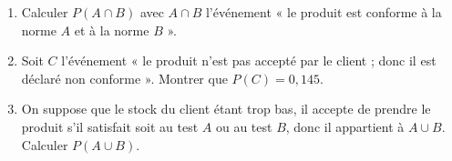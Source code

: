 \documentclass[11pt]{article}
\begin{document}
\begin{enumerate}
  \item Calculer $P(A \cap B)$ avec $A \cap B$ l'événement « le produit est conforme à la norme $A$ et à la norme $B$ ».
  \item Soit $C$ l'événement « le produit n'est pas accepté par le client ; donc il est déclaré non conforme ». Montrer que $P(C) = 0{,}145$.
  \item On suppose que le stock du client étant trop bas, il accepte de prendre le produit s'il satisfait soit au test $A$ ou au test $B$, donc il appartient à $A \cup B$. Calculer $P(A \cup B)$.
\end{enumerate}
\end{document}
